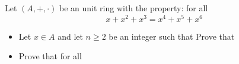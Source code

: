 Let $(A,+,\cdot)$ be an unit ring with the property: for all 
\[ x+x^{2}+x^{3}=x^{4}+x^{5}+x^{6} \]
\begin{itemize}
	\item Let $x\in A$ and let $n\geq2$ be an integer such that  Prove that 
	\item Prove that  for all 
\end{itemize}
